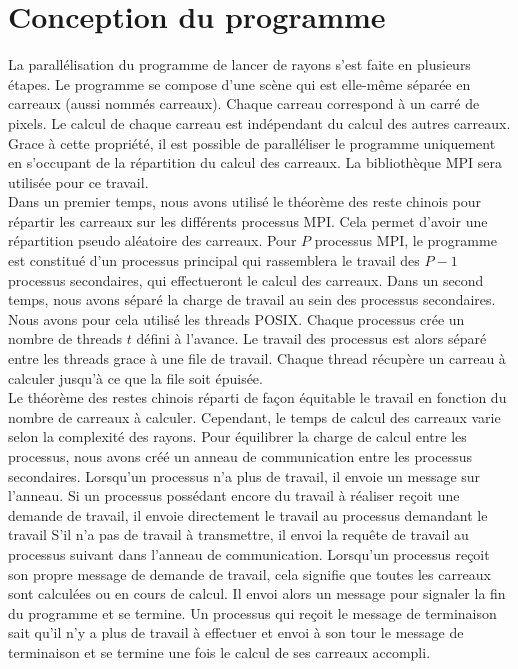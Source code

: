 \section{Conception du programme} %
\label{sec:conception}

La parallélisation du programme de lancer de rayons s'est faite en plusieurs étapes. Le programme se compose d'une scène qui est elle-même séparée en carreaux (aussi nommés carreaux). Chaque carreau correspond à un carré de pixels. Le calcul de chaque carreau est indépendant du calcul des autres carreaux. Grace à cette propriété, il est possible de paralléliser le programme uniquement en s'occupant de la répartition du calcul des carreaux. La bibliothèque MPI sera utilisée pour ce travail.\\

Dans un premier temps, nous avons utilisé le théorème des reste chinois pour répartir les carreaux sur les différents processus MPI. Cela permet d'avoir une répartition pseudo aléatoire des carreaux. Pour $P$ processus MPI, le programme est constitué d'un processus principal qui rassemblera le travail des $P-1$ processus secondaires, qui effectueront le calcul des carreaux. Dans un second temps, nous avons séparé la charge de travail au sein des processus secondaires. Nous avons pour cela utilisé les threads POSIX. Chaque processus crée un nombre de threads $t$ défini à l'avance. Le travail des processus est alors séparé entre les threads grace à une file de travail. Chaque thread récupère un carreau à calculer jusqu'à ce que la file soit épuisée.\\

Le théorème des restes chinois réparti de façon équitable le travail en fonction du nombre de carreaux à calculer. Cependant, le temps de calcul des carreaux varie selon la complexité des rayons. Pour équilibrer la charge de calcul entre les processus, nous avons créé un anneau de communication entre les processus secondaires. Lorsqu'un processus n'a plus de travail, il envoie un message sur l'anneau. Si un processus possédant encore du travail à réaliser reçoit une demande de travail, il envoie directement le travail au processus demandant le travail S'il n'a pas de travail à transmettre, il envoi la requête de travail au processus suivant dans l'anneau de communication. Lorsqu'un processus reçoit son propre message de demande de travail, cela signifie que toutes les carreaux sont calculées ou en cours de calcul. Il envoi alors un message pour signaler la fin du programme et se termine. Un processus qui reçoit le message de terminaison sait qu'il n'y a plus de travail à effectuer et envoi à son tour le message de terminaison et se termine une fois le calcul de ses carreaux accompli.

